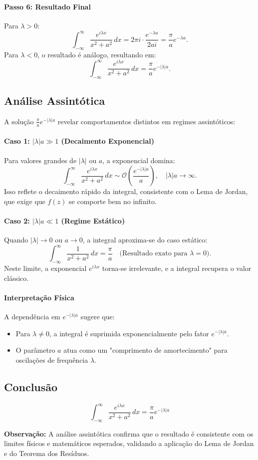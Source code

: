 \documentclass{article}
\begin{document}
\paragraph{Passo 6: Resultado Final}
Para \(\lambda > 0\):
\[
\int_{-\infty}^{\infty} \frac{e^{i\lambda x}}{x^2 + a^2} \, dx = 2\pi i \cdot \frac{e^{-\lambda a}}{2ai} = \frac{\pi}{a} e^{-\lambda a}.
\]
Para \(\lambda < 0\), o resultado é análogo, resultando em:
\[
\int_{-\infty}^{\infty} \frac{e^{i\lambda x}}{x^2 + a^2} \, dx = \frac{\pi}{a} e^{-|\lambda| a}.
\]

\subsection*{Análise Assintótica}

A solução \(\displaystyle \frac{\pi}{a} e^{-|\lambda| a}\) revelar comportamentos distintos em regimes assintóticos:

\paragraph{Caso 1: \(|\lambda| a \gg 1\) (Decaimento Exponencial)}
Para valores grandes de \(|\lambda|\) ou \(a\), a exponencial domina:
\[
\int_{-\infty}^{\infty} \frac{e^{i\lambda x}}{x^2 + a^2} \, dx \sim \mathcal{O}\left(\frac{e^{-|\lambda| a}}{a}\right), \quad |\lambda| a \to \infty.
\]
Isso reflete o decaimento rápido da integral, consistente com o Lema de Jordan, que exige que \(f(z)\) se comporte bem no infinito.

\paragraph{Caso 2: \(|\lambda| a \ll 1\) (Regime Estático)}
Quando \(|\lambda| \to 0\) ou \(a \to 0\), a integral aproxima-se do caso estático:
\[
\int_{-\infty}^{\infty} \frac{1}{x^2 + a^2} \, dx = \frac{\pi}{a} \quad \text{(Resultado exato para \(\lambda = 0\))}.
\]
Neste limite, a exponencial \(e^{i\lambda x}\) torna-se irrelevante, e a integral recupera o valor clássico.

\paragraph{Interpretação Física}
A dependência em \(e^{-|\lambda| a}\) sugere que:
\begin{itemize}
    \item Para \(\lambda \neq 0\), a integral é suprimida exponencialmente pelo fator \(e^{-|\lambda| a}\).
    \item O parâmetro \(a\) atua como um "comprimento de amortecimento" para oscilações de frequência \(\lambda\).
\end{itemize}

\subsection*{Conclusão}
\[
\boxed{
\int_{-\infty}^{\infty} \frac{e^{i\lambda x}}{x^2 + a^2} \, dx = \frac{\pi}{a} e^{-|\lambda| a}
}
\]

\textbf{Observação:} A análise assintótica confirma que o resultado é consistente com os limites físicos e matemáticos esperados, validando a aplicação do Lema de Jordan e do Teorema dos Resíduos.
\end{document}
